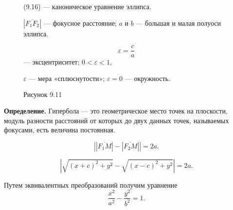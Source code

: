 \documentclass[12pt,a4paper]{article}
\begin{document}
\begin{figure}[H]
  \centering
  \begin{minipage}{0.4\textwidth}
    \centering
    \caption*{Рисунок 9.11}
  \end{minipage}%
  \begin{minipage}{0.55\textwidth}
    (9.16) --- каноническое уравнение эллипса.

    $|\overline{F_1F_2}|$ --- фокусное расстояние; $a$ и $b$ ---
    большая и малая полуоси эллипса.

    $$
    \varepsilon=\frac ca
    $$
    --- эксцентриситет; $0<\varepsilon<1$,

    $\varepsilon$ --- мера «сплюснутости»; $\varepsilon=0$ --- окружность.
  \end{minipage}
\end{figure}

\textbf{Определение.} Гипербола --- это геометрическое место точек на
плоскости, модуль разности расстояний от которых до двух данных
точек, называемых фокусами, есть величина постоянная.

$$
\left||\overline{F_1M}|-|\overline{F_2M}|\right|=2a.
$$

\begin{equation}
  \left|
  \sqrt{(x+c)^2+y^2}
  -
  \sqrt{(x-c)^2+y^2}
  \right|
  =
  2a. \tag{9.17}
\end{equation}

Путем эквивалентных преобразований получим уравнение
\begin{equation}
  \frac{x^2}{a^2}-\frac{y^2}{b^2}=1. \tag{9.18}
\end{equation}
\end{document}
